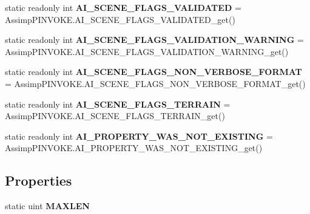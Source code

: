 \begin{DoxyCompactItemize}
\item 
\hypertarget{class_assimp_a4ffc52c354ee6b40d02c276a4b974474}{static readonly int {\bfseries A\+I\+\_\+\+S\+C\+E\+N\+E\+\_\+\+F\+L\+A\+G\+S\+\_\+\+V\+A\+L\+I\+D\+A\+T\+E\+D} = Assimp\+P\+I\+N\+V\+O\+K\+E.\+A\+I\+\_\+\+S\+C\+E\+N\+E\+\_\+\+F\+L\+A\+G\+S\+\_\+\+V\+A\+L\+I\+D\+A\+T\+E\+D\+\_\+get()}\label{class_assimp_a4ffc52c354ee6b40d02c276a4b974474}

\item 
\hypertarget{class_assimp_a7b1844d484f6bb50780ec27e5c14e250}{static readonly int {\bfseries A\+I\+\_\+\+S\+C\+E\+N\+E\+\_\+\+F\+L\+A\+G\+S\+\_\+\+V\+A\+L\+I\+D\+A\+T\+I\+O\+N\+\_\+\+W\+A\+R\+N\+I\+N\+G} = Assimp\+P\+I\+N\+V\+O\+K\+E.\+A\+I\+\_\+\+S\+C\+E\+N\+E\+\_\+\+F\+L\+A\+G\+S\+\_\+\+V\+A\+L\+I\+D\+A\+T\+I\+O\+N\+\_\+\+W\+A\+R\+N\+I\+N\+G\+\_\+get()}\label{class_assimp_a7b1844d484f6bb50780ec27e5c14e250}

\item 
\hypertarget{class_assimp_a1c6030226a40db4c182431c1657c5454}{static readonly int {\bfseries A\+I\+\_\+\+S\+C\+E\+N\+E\+\_\+\+F\+L\+A\+G\+S\+\_\+\+N\+O\+N\+\_\+\+V\+E\+R\+B\+O\+S\+E\+\_\+\+F\+O\+R\+M\+A\+T} = Assimp\+P\+I\+N\+V\+O\+K\+E.\+A\+I\+\_\+\+S\+C\+E\+N\+E\+\_\+\+F\+L\+A\+G\+S\+\_\+\+N\+O\+N\+\_\+\+V\+E\+R\+B\+O\+S\+E\+\_\+\+F\+O\+R\+M\+A\+T\+\_\+get()}\label{class_assimp_a1c6030226a40db4c182431c1657c5454}

\item 
\hypertarget{class_assimp_add41bfe7e9c5ed805b106000e2d3fc9e}{static readonly int {\bfseries A\+I\+\_\+\+S\+C\+E\+N\+E\+\_\+\+F\+L\+A\+G\+S\+\_\+\+T\+E\+R\+R\+A\+I\+N} = Assimp\+P\+I\+N\+V\+O\+K\+E.\+A\+I\+\_\+\+S\+C\+E\+N\+E\+\_\+\+F\+L\+A\+G\+S\+\_\+\+T\+E\+R\+R\+A\+I\+N\+\_\+get()}\label{class_assimp_add41bfe7e9c5ed805b106000e2d3fc9e}

\item 
\hypertarget{class_assimp_a7985663111d4c08fa62f9bcf5c90042a}{static readonly int {\bfseries A\+I\+\_\+\+P\+R\+O\+P\+E\+R\+T\+Y\+\_\+\+W\+A\+S\+\_\+\+N\+O\+T\+\_\+\+E\+X\+I\+S\+T\+I\+N\+G} = Assimp\+P\+I\+N\+V\+O\+K\+E.\+A\+I\+\_\+\+P\+R\+O\+P\+E\+R\+T\+Y\+\_\+\+W\+A\+S\+\_\+\+N\+O\+T\+\_\+\+E\+X\+I\+S\+T\+I\+N\+G\+\_\+get()}\label{class_assimp_a7985663111d4c08fa62f9bcf5c90042a}

\end{DoxyCompactItemize}
\subsection*{Properties}
\begin{DoxyCompactItemize}
\item 
\hypertarget{class_assimp_a620954e14460bff10ee3c2ef7f3fa16c}{static uint {\bfseries M\+A\+X\+L\+E\+N}}\label{class_assimp_a620954e14460bff10ee3c2ef7f3fa16c}

\end{DoxyCompactItemize}


